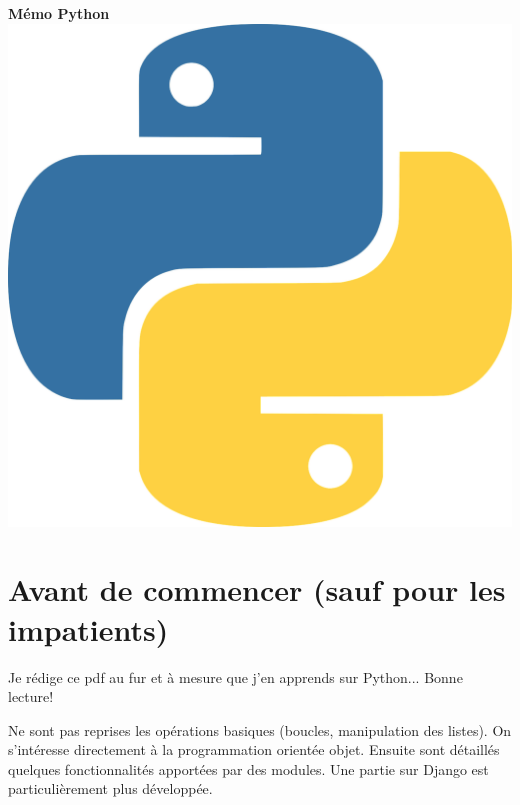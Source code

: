 \documentclass[a4paper, 10pt]{article}
\begin{document}

\begin{center}
        {\Huge{\sc\bfseries{Mémo Python}}}\\[20pt]
        \includegraphics[scale=0.07]{python.png}
        \vspace{20pt}
\end{center}

\tableofcontents

\hypersetup{linkcolor=blue}

\newpage
\section*{Avant de commencer (sauf pour les impatients)}

Je  rédige ce pdf au fur et à mesure que j'en apprends sur Python... Bonne lecture!\bigskip

Ne sont pas reprises les opérations \og basiques \fg{} (boucles, manipulation des listes). On s'intéresse directement à la programmation orientée objet. Ensuite sont détaillés quelques fonctionnalités apportées par des modules. Une partie sur Django est particulièrement plus développée.\bigskip
\end{document}
